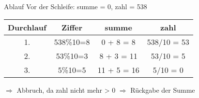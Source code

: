 \begin{enumerate}
\begin{enumerate}
Ablauf
Vor der Schleife: summe = 0, zahl = 538
\begin{table}[h]
\begin{center}
\begin{tabular}{c|c|c|c}
Durchlauf & Ziffer & summe & zahl\\
\hline
1. & 538\%10=8 & 0 + 8 = 8 & 538/10 = 53 \\
2. & 53\%10=3 & 8 + 3 = 11 & 53/10 = 5 \\
3. & 5\%10=5 & 11 + 5 = 16 & 5/10 = 0 \\
\end{tabular}
\end{center}
\end{table}
$\Rightarrow$ Abbruch, da zahl nicht mehr > 0
$\Rightarrow$ Rückgabe der Summe
\end{enumerate}
\end{enumerate}

